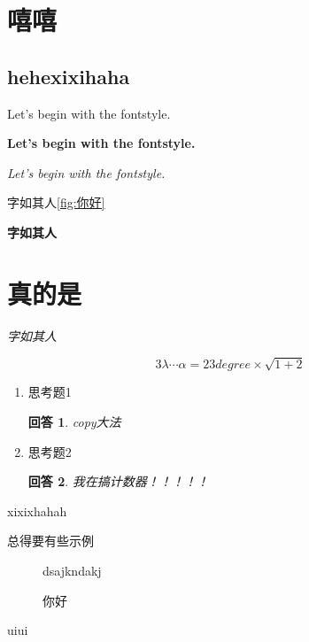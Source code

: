 \documentclass[no-math , zihao = -4]{ctexart}
\newtheorem{ans}{回答}[enumi]
\begin{document}
    \section{嘻嘻}
    \subsection{hehexixihaha}
    Let's begin with the fontstyle.\par
    \textbf{Let's begin with the fontstyle.}\par
    \textit{Let's begin with the fontstyle.}\par
    字如其人\autoref{fig:你好}\par
    \textbf{字如其人}\par
    \section{真的是}
    \textit{字如其人}\par
    \begin{equation}
        3\lambda \cdots \alpha = 23 degree \times \sqrt{1+2}
    \end{equation}

    \begin{enumerate}
        \item 思考题1
        \begin{ans}
            copy大法
        \end{ans}
        
        \item 思考题2
        \begin{ans}
            我在搞计数器！！！！！
        \end{ans}
    \end{enumerate}
    
    \begin{table}[h]
        \centering
        xixixhahah
        \caption{总得要有些示例}
    \end{table}

    \begin{figure}[h]
        dsajkndakj
        \caption{你好}
        \label{fig:你好}
    \end{figure}
    \newpage
    
    uiui
    
\end{document}
